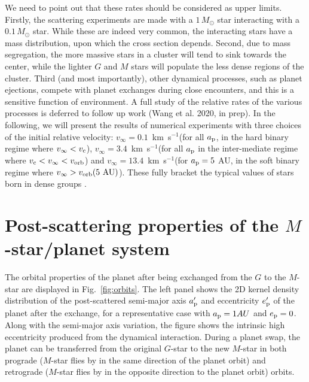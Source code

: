 \documentclass[twocolumn]{aastex62}
\begin{document}
We need to point out that these rates 
should be considered as upper limits. Firstly, the scattering experiments are made with a $1\,M_\odot$ star interacting with a $0.1\,M_\odot$ star.
While these are indeed very common, the interacting stars have a mass distribution, upon which the cross section depends.
Second, {\color{red} due to mass segregation, the more massive stars in a cluster will tend to sink towards the center, while the lighter $G$ and $M$ stars will populate the less dense regions of the cluster. 
}
Third (and most importantly), 
other dynamical processes, such as planet ejections, compete with planet exchanges during close encounters, and this is a sensitive function of environment.  
A full study of the relative rates of the various processes is deferred to follow up work (Wang et al. 2020, in prep).
{\color{red}
In the following, we will present the results
of numerical experiments with three choices of the initial relative velocity: $v_\infty =0.1$~km~s$^{-1}$(for all $a_{\rm p}$, in the hard binary regime where $v_\infty < v_{\rm c}$),
$v_\infty =3.4$~km~s$^{-1}$(for all $a_{\rm p}$ in the inter-mediate regime where $v_{\rm c} < v_\infty < v_{\rm orb}$)
and $v_\infty =13.4$~km~s$^{-1}$(for $a_{\rm p}=5$ AU, in the soft binary regime where  $v_\infty > v_{\rm orb}(5~{\rm AU})$).
These fully bracket the typical values
of stars born in dense groups \citep{Binney1987,Adams2001}.
}




\section{Post-scattering properties of the $M$-star/planet system}

The orbital properties of the planet after being exchanged from the $G$ to the $M$-star are displayed in Fig.~\ref{fig:orbits}. The left panel shows the 2D kernel density distribution of the post-scattered semi-major axis $a_{\rm p}^\prime$ and eccentricity $e_{\rm p}^\prime$ of the  planet after the exchange, for a representative case with $a_{\rm p}=1AU$ and $e_{\rm p}=0$. 
Along with the semi-major axis variation, 
the figure shows the
intrinsic high eccentricity produced from the dynamical interaction. During a planet swap, the planet can be transferred from the original $G$-star to the new $M$-star in both prograde ($M$-star flies by in the same direction of the planet orbit) and retrograde ($M$-star flies by in the opposite direction to the planet orbit) orbits. 
\end{document}
